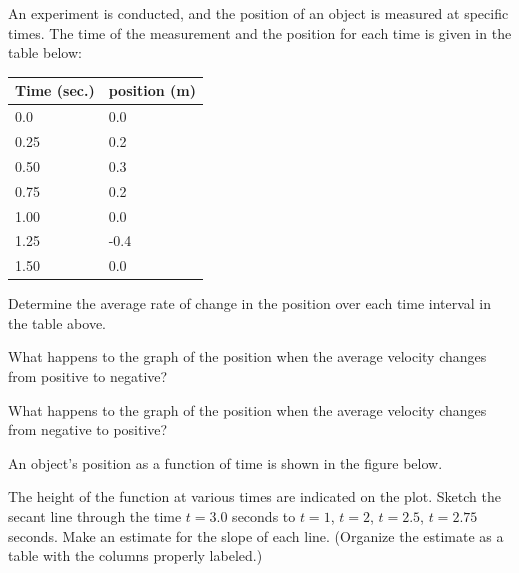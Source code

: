 \begin{problem}
\item An experiment is conducted, and the position of an object is
  measured at specific times. The time of the measurement and the
  position for each time is given in the table below: \\
  \begin{tabular}{ll}
    Time (sec.) & position (m) \\ \hline
    0.0  & 0.0 \\
    0.25 & 0.2 \\
    0.50 & 0.3 \\
    0.75 & 0.2 \\
    1.00 & 0.0 \\
    1.25 & -0.4 \\
    1.50 & 0.0
  \end{tabular}
  \begin{subproblem}
  \item Determine the average rate of change in the position over each
    time interval in the table above.
    \vfill

  \item What happens to the graph of the position when the average
    velocity changes from positive to negative?  
    \vspace{2em}

  \item What happens to the graph of the position when the average
    velocity changes from negative to positive?
    \vspace{2em}

  \end{subproblem}

  \clearpage

  \item An object's position as a function of time is shown in the
    figure below. 

    \scalebox{0.5}{}

    \begin{subproblem}
    \item The height of the function at various times are indicated on
      the plot. Sketch the secant line through the time $t=3.0$
      seconds to $t=1$, $t=2$, $t=2.5$, $t=2.75$ seconds. Make an
      estimate for the slope of each line. (Organize the estimate as a
      table with the columns properly labeled.)

      \vfill


\end{subproblem}
\end{problem}
